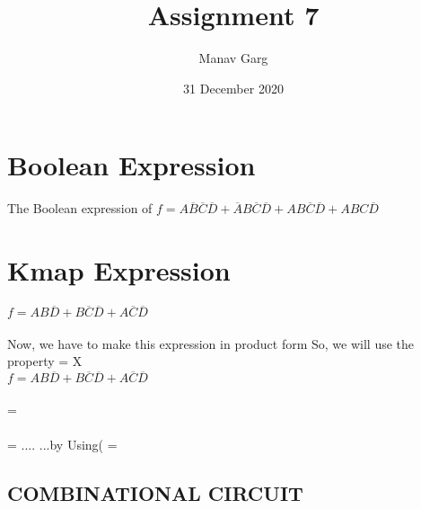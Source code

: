 \documentclass{article}
\begin{document}
\title{
Assignment 7
}
\author{Manav Garg}

\date{31 December 2020}
\maketitle


\section{Boolean Expression}
The Boolean expression of $f = A\overline{B}\overline{C}\overline{D} + \overline{A}B\overline{C}\overline{D} + AB\overline{C}\overline{D} + ABC\overline{D}$ \\ 
\section{Kmap Expression}
$f= AB\overline{D} + B\overline{C}\overline{D} + A\overline{C}\overline{D}$ \\
\\
Now, we have to make this expression in product form
So, we will use the property  = X\\
$f= AB\overline{D} + B\overline{C}\overline{D} + A\overline{C}\overline{D}$ \\
\\
 =  \\
\\
     = ....         ...by Using( = 




\subsection{COMBINATIONAL CIRCUIT}
\end{document}
